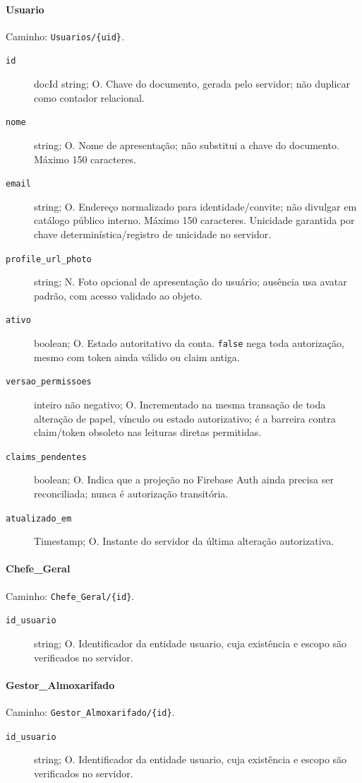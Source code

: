 \paragraph{Usuario}\mbox{}\par
Caminho: \texttt{Usuarios/\{uid\}}.
\begin{description}
\item[\texttt{id}] docId string; O. Chave do documento, gerada pelo servidor; não duplicar como contador relacional.
\item[\texttt{nome}] string; O. Nome de apresentação; não substitui a chave do documento. Máximo 150 caracteres.
\item[\texttt{email}] string; O. Endereço normalizado para identidade/convite; não divulgar em catálogo público interno. Máximo 150 caracteres. Unicidade garantida por chave determinística/registro de unicidade no servidor.
\item[\texttt{profile\_url\_photo}] string; N. Foto opcional de apresentação do usuário; ausência usa avatar padrão, com acesso validado ao objeto.
\item[\texttt{ativo}] boolean; O. Estado autoritativo da conta. \texttt{false} nega toda autorização, mesmo com token ainda válido ou claim antiga.
\item[\texttt{versao\_permissoes}] inteiro não negativo; O. Incrementado na mesma transação de toda alteração de papel, vínculo ou estado autorizativo; é a barreira contra claim/token obsoleto nas leituras diretas permitidas.
\item[\texttt{claims\_pendentes}] boolean; O. Indica que a projeção no Firebase Auth ainda precisa ser reconciliada; nunca é autorização transitória.
\item[\texttt{atualizado\_em}] Timestamp; O. Instante do servidor da última alteração autorizativa.
\end{description}

\paragraph{Chefe\_Geral}\mbox{}\par
Caminho: \texttt{Chefe\_Geral/\{id\}}.
\begin{description}
\item[\texttt{id\_usuario}] string; O. Identificador da entidade usuario, cuja existência e escopo são verificados no servidor.
\end{description}

\paragraph{Gestor\_Almoxarifado}\mbox{}\par
Caminho: \texttt{Gestor\_Almoxarifado/\{id\}}.
\begin{description}
\item[\texttt{id\_usuario}] string; O. Identificador da entidade usuario, cuja existência e escopo são verificados no servidor.
\end{description}

